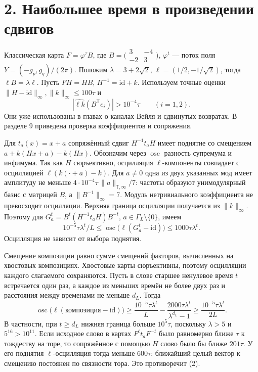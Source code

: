 \documentclass[11pt,a4paper]{article}
\newcommand{\osc}{\operatorname{osc}}
\newcommand{\T}{\mathbb{T}}
\newcommand{\sect}[1]{\section*{\sffamily\color{ink}#1}}
\begin{document}
\newpage
\sect{2. Наибольшее время в произведении сдвигов}
Классическая карта \(F=\varphi^\tau B\), где \(B=\bigl(\begin{smallmatrix}3&-4\\-2&3\end{smallmatrix}\bigr)\), \(\varphi^t\) — поток поля \(Y=(-g_p,g_q)/(2\pi)\). Положим \(\lambda=3+2\sqrt2\), \(\ell=(1/2,-1/\sqrt2)\), тогда \(\ell B=\lambda\ell\). Пусть \(F H=HB\), \(H^{-1}=\mathrm{id}+k\). Используем точные оценки \(\|H-\mathrm{id}\|_\infty,\|k\|_\infty\le100\tau\) и
\[
           |\widehat{\ell k}(B^{\mathsf T}e_i)|>10^{-4}\tau
                \qquad(i=1,2).
\]
Они уже использованы в главах о каналах Вейля и сдвинутых возвратах. В разделе 9 приведена проверка коэффициентов и сопряжения.

Для \(t_a(x)=x+a\) сопряжённый сдвиг \(H^{-1}t_a H\) имеет поднятие со смещением \(a+k(Hx+a)-k(Hx)\). Обозначим через \(\osc\) разность супремума и инфимума. Так как \(H\) сюръективно, осцилляция \(\ell\)-компоненты совпадает с осцилляцией \(\ell(k(\cdot+a)-k)\). Для \(a\ne0\) одна из двух указанных мод имеет амплитуду не меньше \(4\cdot10^{-4}\tau\,\|a\|_{\T,\infty}/7\): частоты образуют унимодулярный базис с матрицей \(B\), а \(\|B^{-1}\|_\infty=7\). Модуль нетривиального коэффициента не превосходит осцилляции. Верхняя граница осцилляции получается из \(\|k\|_\infty\). Поэтому для
\(G^t_a=B^t(H^{-1}t_a H)B^{-t}\), \(a\in\Gamma_L\setminus\{0\}\), имеем
\[
    10^{-5}\tau\lambda^t/L
       \le \osc\bigl(\ell(G^t_a-\mathrm{id})\bigr)
       \le 1000\tau\lambda^t .                               \tag{1}
\]
Осцилляция не зависит от выбора поднятия.

Смещение композиции равно сумме смещений факторов, вычисленных на хвостовых композициях. Хвостовые карты сюръективны, поэтому осцилляции каждого слагаемого сохраняются. Пусть в слове старшее ненулевое время \(t\) встречается один раз, а каждое из меньших времён не более двух раз и расстояния между временами не меньше \(d_L\). Тогда
\[
 \osc\bigl(\ell(\text{композиция}-\mathrm{id})\bigr)
 \ge \frac{10^{-5}\tau\lambda^t}{L}
             -\frac{2000\tau\lambda^t}{\lambda^{d_L}-1}
 \ge \frac{10^{-5}\tau\lambda^t}{2L}.                          \tag{2}
\]
В частности, при \(t\ge d_L\) нижняя граница больше \(10^5\tau\), поскольку \(\lambda>5\) и \(5^{16}>10^{11}\). Если исходное слово в картах \(F^t t_a F^{-t}\) было равномерно ближе \(\tau\) к тождеству на торе, то сопряжённое с помощью \(H\) слово было бы ближе \(201\tau\). У его поднятия \(\ell\)-осцилляция тогда меньше \(600\tau\): ближайший целый вектор к смещению постоянен по связности тора. Это противоречит (2).
\end{document}
